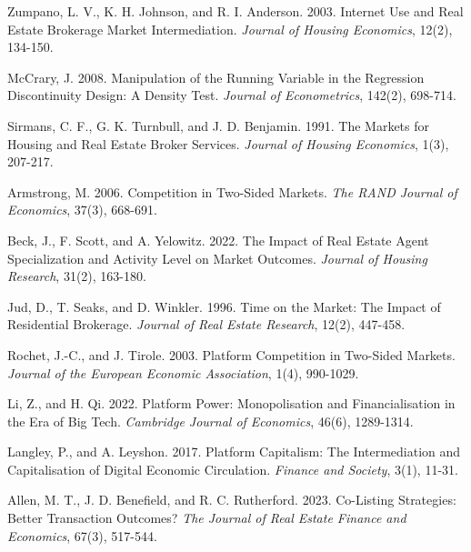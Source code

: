 \documentclass[11pt]{article}
\begin{document}
\begin{singlespace}
\begin{thebibliography}{}
  Zumpano, L. V., K. H. Johnson, and R. I. Anderson. 2003. Internet Use and Real Estate Brokerage Market Intermediation. \textit{Journal of Housing Economics}, 12(2), 134-150.
  
  McCrary, J. 2008. Manipulation of the Running Variable in the Regression Discontinuity Design: A Density Test. \textit{Journal of Econometrics}, 142(2), 698-714.
  
  Sirmans, C. F., G. K. Turnbull, and J. D. Benjamin. 1991. The Markets for Housing and Real Estate Broker Services. \textit{Journal of Housing Economics}, 1(3), 207-217.
  
  Armstrong, M. 2006. Competition in Two-Sided Markets. \textit{The RAND Journal of Economics}, 37(3), 668-691.
  
  Beck, J., F. Scott, and A. Yelowitz. 2022. The Impact of Real Estate Agent Specialization and Activity Level on Market Outcomes. \textit{Journal of Housing Research}, 31(2), 163-180.
  
  Jud, D., T. Seaks, and D. Winkler. 1996. Time on the Market: The Impact of Residential Brokerage. \textit{Journal of Real Estate Research}, 12(2), 447-458.
  
  Rochet, J.-C., and J. Tirole. 2003. Platform Competition in Two-Sided Markets. \textit{Journal of the European Economic Association}, 1(4), 990-1029.
  
  Li, Z., and H. Qi. 2022. Platform Power: Monopolisation and Financialisation in the Era of Big Tech. \textit{Cambridge Journal of Economics}, 46(6), 1289-1314.
  
  Langley, P., and A. Leyshon. 2017. Platform Capitalism: The Intermediation and Capitalisation of Digital Economic Circulation. \textit{Finance and Society}, 3(1), 11-31.
  
  Allen, M. T., J. D. Benefield, and R. C. Rutherford. 2023. Co-Listing Strategies: Better Transaction Outcomes? \textit{The Journal of Real Estate Finance and Economics}, 67(3), 517-544.
  

\end{thebibliography}
\end{singlespace}
\end{document}
